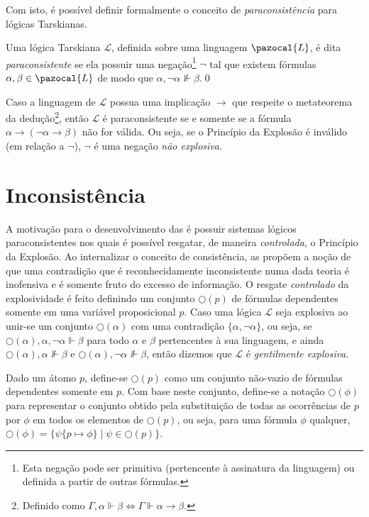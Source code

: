 \begin{definicao}
    Com isto, é possível definir formalmente o conceito de \textit{paraconsistência} para lógicas Tarskianas.

    \begin{definicao}
        \label{def:tarskiana_paracons}
        Uma lógica Tarskiana $\mathcal{L}$, definida sobre uma linguagem $\pazocal{L}$, é dita \textit{paraconsistente} se ela possuir uma negação\footnote{Esta negação pode ser primitiva (pertencente à assinatura da linguagem) ou definida a partir de outras fórmulas.} $\neg$ tal que existem fórmulas $\alpha, \beta \in \pazocal{L}$ de modo que $\alpha, \neg \alpha \nVdash \beta$.\qed{}
    \end{definicao}

    Caso a linguagem de $\mathcal{L}$ possua uma implicação $\rightarrow$ que respeite o metateorema da dedução\footnote{Definido como $\Gamma, \alpha \Vdash \beta \Longleftrightarrow  \Gamma\Vdash \alpha \rightarrow \beta$.}, então $\mathcal{L}$ é paraconsistente se e somente se a fórmula $\alpha \rightarrow (\neg \alpha \rightarrow \beta)$ não for válida. Ou seja, se o Princípio da Explosão é inválido (em relação a $\neg$), $\neg$ é uma negação \textit{não explosiva}.

\section{Inconsistência}
\label{sec:incons}
    A motivação para o desenvolvimento das \lfis{} é possuir sistemas lógicos paraconsistentes nos quais é possível resgatar, de maneira \textit{controlada}, o Princípio da Explosão. Ao internalizar o conceito de consistência, as \lfis{} propõem a noção de que uma contradição que é reconhecidamente inconsistente numa dada teoria é inofensiva e é somente fruto do excesso de informação. O resgate \textit{controlado} da explosividade é feito definindo um conjunto $\bigcirc(p)$ de fórmulas dependentes somente em uma variável proposicional $p$. Caso uma lógica $\mathcal{L}$ seja explosiva ao unir-se um conjunto $\bigcirc(\alpha)$ com uma contradição $\{\alpha, \neg \alpha\}$, ou seja, se $\bigcirc(\alpha), \alpha, \neg \alpha \Vdash \beta$ para todo $\alpha$ e $\beta$ pertencentes à sua linguagem, e ainda $\bigcirc(\alpha), \alpha \nVdash \beta$ e $\bigcirc(\alpha), \neg \alpha \nVdash \beta$, então dizemos que $\mathcal{L}$ é \textit{gentilmente explosiva}.

    \begin{notacao}
        Dado um átomo $p$, define-se $\bigcirc(p)$ como um conjunto não-vazio de fórmulas dependentes somente em $p$. Com base neste conjunto, define-se a notação $\bigcirc(\phi)$ para representar o conjunto obtido pela substituição de todas as ocorrências de $p$ por $\phi$ em todos os elementos de $\bigcirc(p)$, ou seja, para uma fórmula $\phi$ qualquer, $\bigcirc(\phi) = \{\psi\{p \mapsto \phi\} \; | \; \psi \in \bigcirc(p)\}$.
    \end{notacao}



\end{definicao}
